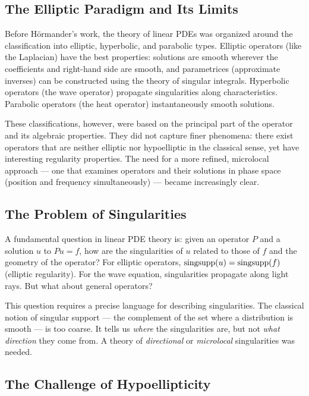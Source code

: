 \subsection{The Elliptic Paradigm and Its Limits}

Before H\"ormander's work, the theory of linear PDEs was organized
around the classification into elliptic, hyperbolic, and parabolic
types. Elliptic operators (like the Laplacian) have the best properties:
solutions are smooth wherever the coefficients and right-hand side are
smooth, and parametrices (approximate inverses) can be constructed using
the theory of singular integrals. Hyperbolic operators (the wave
operator) propagate singularities along characteristics. Parabolic
operators (the heat operator) instantaneously smooth solutions.

These classifications, however, were based on the principal part of the
operator and its algebraic properties. They did not capture finer
phenomena: there exist operators that are neither elliptic nor
hypoelliptic in the classical sense, yet have interesting regularity
properties. The need for a more refined, microlocal approach --- one
that examines operators and their solutions in phase space (position
and frequency simultaneously) --- became increasingly clear.

\subsection{The Problem of Singularities}

A fundamental question in linear PDE theory is: given an operator \(P\)
and a solution \(u\) to \(Pu = f\), how are the singularities of \(u\)
related to those of \(f\) and the geometry of the operator? For
elliptic operators, \(\operatorname{singsupp}(u) = \operatorname{singsupp}(f)\) (elliptic regularity).
For the wave equation, singularities propagate along light rays. But
what about general operators?

This question requires a precise language for describing singularities.
The classical notion of singular support --- the complement of the set
where a distribution is smooth --- is too coarse. It tells us
\textit{where} the singularities are, but not \textit{what direction}
they come from. A theory of \textit{directional} or
\textit{microlocal} singularities was needed.

\subsection{The Challenge of Hypoellipticity}

